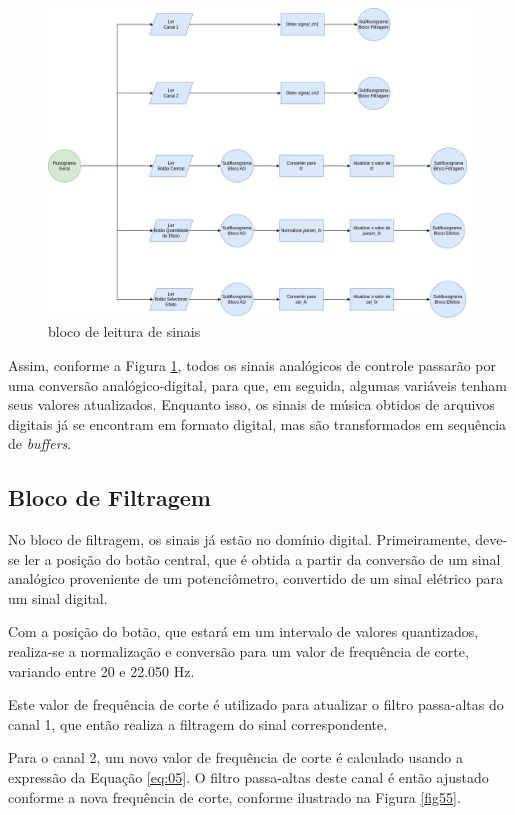 \begin{figure}[h]
    \centering
    \includegraphics[width=\textwidth]{figuras/fig54.png}
    \caption{bloco de leitura de sinais}
    \label{fig54}
\end{figure}

Assim, conforme a Figura \ref{fig54}, todos os sinais analógicos de controle passarão por uma conversão analógico-digital, para que, em seguida, algumas variáveis tenham seus valores atualizados. Enquanto isso, os sinais de música obtidos de arquivos digitais já se encontram em formato digital, mas são transformados em sequência de \textit{buffers}.

\subsection{Bloco de Filtragem}

No bloco de filtragem, os sinais já estão no domínio digital. Primeiramente, deve-se ler a posição do botão central, que é obtida a partir da conversão de um sinal analógico proveniente de um potenciômetro, convertido de um sinal elétrico para um sinal digital.

Com a posição do botão, que estará em um intervalo de valores quantizados, realiza-se a normalização e conversão para um valor de frequência de corte, variando entre 20 e 22.050 Hz.

Este valor de frequência de corte é utilizado para atualizar o filtro passa-altas do canal 1, que então realiza a filtragem do sinal correspondente.

Para o canal 2, um novo valor de frequência de corte é calculado usando a expressão da Equação \ref{eq:05}. O filtro passa-altas deste canal é então ajustado conforme a nova frequência de corte, conforme ilustrado na Figura \ref{fig55}.

